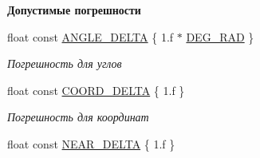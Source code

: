 \begin{Indent}\textbf{ Допустимые погрешности}\par
\begin{DoxyCompactItemize}
\item 
\mbox{\label{namespacertm_ac78c5105838adb58682cb69a4c66efd7}} 
float const \hyperlink{namespacertm_ac78c5105838adb58682cb69a4c66efd7}{A\+N\+G\+L\+E\+\_\+\+D\+E\+L\+TA} \{ 1.f $\ast$ \hyperlink{namespacertm_a797faf3037681ed7bc153db9eca6155e}{D\+E\+G\+\_\+\+R\+AD} \}
\begin{DoxyCompactList}\small\item\em Погрешность для углов \end{DoxyCompactList}\item 
\mbox{\label{namespacertm_a9ae158a8873bdf59aa9872cdada6c657}} 
float const \hyperlink{namespacertm_a9ae158a8873bdf59aa9872cdada6c657}{C\+O\+O\+R\+D\+\_\+\+D\+E\+L\+TA} \{ 1.f \}
\begin{DoxyCompactList}\small\item\em Погрешность для координат \end{DoxyCompactList}\item 
float const \hyperlink{namespacertm_ac6b72ea86e31b2b9ba35f29964ce0f5d}{N\+E\+A\+R\+\_\+\+D\+E\+L\+TA} \{ 1.f \}
\end{DoxyCompactItemize}
\end{Indent}
